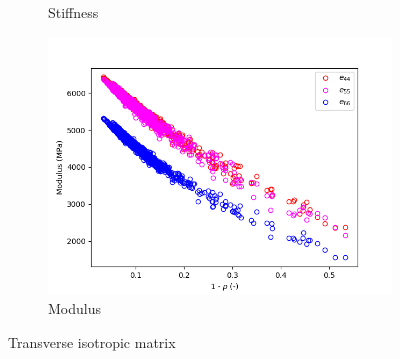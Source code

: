 \documentclass[a4paper,fleqn]{DC_ArtStyle}
\begin{document}
\begin{figure}
\begin{subfigure}[b]{0.45\linewidth}
			\caption{Stiffness}
		\end{subfigure}
		\begin{subfigure}[b]{0.45\linewidth}
			\includegraphics[width=\linewidth]{MuijModulus_Transverse}
			\caption{Modulus}
		\end{subfigure}
		\caption{Transverse isotropic matrix}
	\end{figure}
\end{document}
